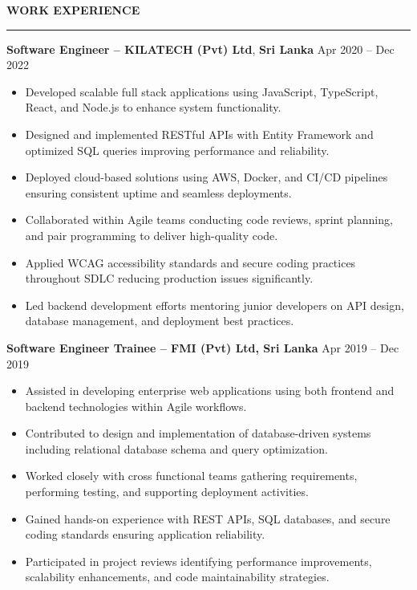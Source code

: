 \documentclass[10pt,letterpaper]{article}
\begin{document}
\textbf{WORK EXPERIENCE}\\[-8pt]
\noindent\rule{\textwidth}{1pt}

\vspace{-2pt}

\textbf{Software Engineer -- KILATECH (Pvt) Ltd}, \textbf{Sri Lanka} \hfill Apr 2020 -- Dec 2022

\vspace{-1pt}

\begin{itemize}
\item Developed scalable full stack applications using JavaScript, TypeScript, React, and Node.js to enhance system functionality.
\item Designed and implemented RESTful APIs with Entity Framework and optimized SQL queries improving performance and reliability.
\item Deployed cloud-based solutions using AWS, Docker, and CI/CD pipelines ensuring consistent uptime and seamless deployments.
\item Collaborated within Agile teams conducting code reviews, sprint planning, and pair programming to deliver high-quality code.
\item Applied WCAG accessibility standards and secure coding practices throughout SDLC reducing production issues significantly.
\item Led backend development efforts mentoring junior developers on API design, database management, and deployment best practices.
\end{itemize}

\textbf{Software Engineer Trainee -- FMI (Pvt) Ltd, Sri Lanka} \hfill Apr 2019 -- Dec 2019

\vspace{-1pt}

\begin{itemize}
\item Assisted in developing enterprise web applications using both frontend and backend technologies within Agile workflows.
\item Contributed to design and implementation of database-driven systems including relational database schema and query optimization.
\item Worked closely with cross functional teams gathering requirements, performing testing, and supporting deployment activities.
\item Gained hands-on experience with REST APIs, SQL databases, and secure coding standards ensuring application reliability.
\item Participated in project reviews identifying performance improvements, scalability enhancements, and code maintainability strategies.
\end{itemize}
\end{document}
